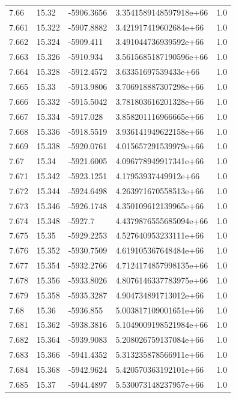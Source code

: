 \begin{tabular}{lllll}
7.66 & 15.32 & -5906.3656 & 3.3541589148597918e+66 & 1.0 \\
7.661 & 15.322 & -5907.8882 & 3.421917419602684e+66 & 1.0 \\
7.662 & 15.324 & -5909.411 & 3.491044736939592e+66 & 1.0 \\
7.663 & 15.326 & -5910.934 & 3.5615685187190596e+66 & 1.0 \\
7.664 & 15.328 & -5912.4572 & 3.63351697539433e+66 & 1.0 \\
7.665 & 15.33 & -5913.9806 & 3.706918887307298e+66 & 1.0 \\
7.666 & 15.332 & -5915.5042 & 3.781803616201328e+66 & 1.0 \\
7.667 & 15.334 & -5917.028 & 3.858201116966665e+66 & 1.0 \\
7.668 & 15.336 & -5918.5519 & 3.936141949622158e+66 & 1.0 \\
7.669 & 15.338 & -5920.0761 & 4.015657291539979e+66 & 1.0 \\
7.67 & 15.34 & -5921.6005 & 4.096778949917341e+66 & 1.0 \\
7.671 & 15.342 & -5923.1251 & 4.17953937449912e+66 & 1.0 \\
7.672 & 15.344 & -5924.6498 & 4.263971670558513e+66 & 1.0 \\
7.673 & 15.346 & -5926.1748 & 4.350109612139965e+66 & 1.0 \\
7.674 & 15.348 & -5927.7 & 4.4379876555685094e+66 & 1.0 \\
7.675 & 15.35 & -5929.2253 & 4.527640953233111e+66 & 1.0 \\
7.676 & 15.352 & -5930.7509 & 4.619105367648484e+66 & 1.0 \\
7.677 & 15.354 & -5932.2766 & 4.7124174857998135e+66 & 1.0 \\
7.678 & 15.356 & -5933.8026 & 4.8076146337783975e+66 & 1.0 \\
7.679 & 15.358 & -5935.3287 & 4.904734891713012e+66 & 1.0 \\
7.68 & 15.36 & -5936.855 & 5.003817109001651e+66 & 1.0 \\
7.681 & 15.362 & -5938.3816 & 5.1049009198521984e+66 & 1.0 \\
7.682 & 15.364 & -5939.9083 & 5.208026759137084e+66 & 1.0 \\
7.683 & 15.366 & -5941.4352 & 5.313235878566911e+66 & 1.0 \\
7.684 & 15.368 & -5942.9624 & 5.420570363192101e+66 & 1.0 \\
7.685 & 15.37 & -5944.4897 & 5.530073148237957e+66 & 1.0 \\

\end{tabular}
